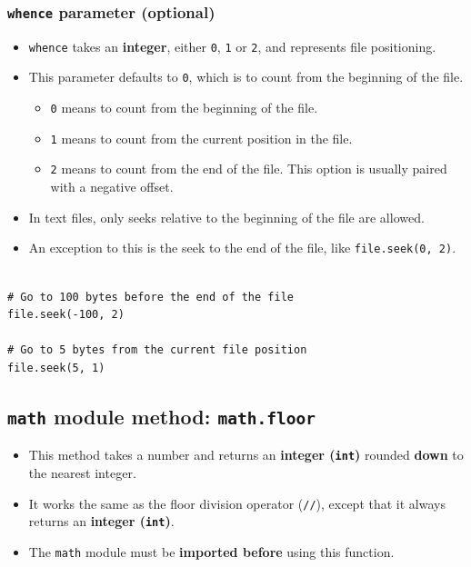 \documentclass[11pt]{article}
\begin{document}
\subsubsection{\texttt{whence} parameter (optional)}
\label{sec:org335a338}
\begin{itemize}
\item \texttt{whence} takes an \textbf{integer}, either \texttt{0}, \texttt{1} or \texttt{2}, and represents file positioning.
\item This parameter defaults to \texttt{0}, which is to count from the beginning of the file.
\begin{itemize}
\item \texttt{0} means to count from the beginning of the file.
\item \texttt{1} means to count from the current position in the file.
\item \texttt{2} means to count from the end of the file. This option is usually paired with a negative offset.
\end{itemize}

\item In text files, only seeks relative to the beginning of the file are allowed.
\item An exception to this is the seek to the end of the file, like \texttt{file.seek(0, 2)}.
\end{itemize}

\begin{verbatim}

# Go to 100 bytes before the end of the file
file.seek(-100, 2)

# Go to 5 bytes from the current file position
file.seek(5, 1)
\end{verbatim}

 \newpage

\subsection{\texttt{math} module method: \texttt{math.floor}}
\label{sec:orgbc2e60c}
\begin{itemize}
\item This method takes a number and returns an \textbf{integer (\texttt{int})} rounded \textbf{down} to the nearest integer.
\item It works the same as the floor division operator (\texttt{//}), except that it always returns an \textbf{integer (\texttt{int})}.
\item The \texttt{math} module must be \textbf{imported before} using this function.
\end{itemize}
\end{document}
